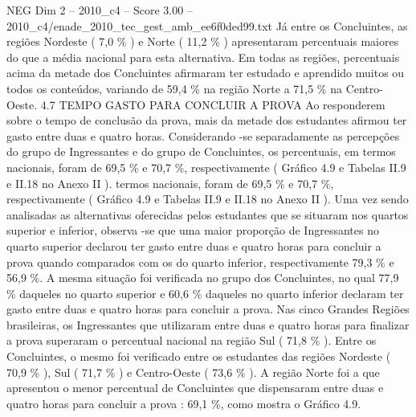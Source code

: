 \begin{textsample}{NEG Dim 2 – 2010\_c4 – Score 3.00 – 2010\_c4/enade\_2010\_tec\_gest\_amb\_ee6f0ded99.txt}
Já entre os Concluintes, as regiões Nordeste ( 7,0 \% ) e Norte ( 11,2 \% ) apresentaram percentuais maiores do que a média nacional para esta alternativa.
Em todas as regiões, percentuais acima da metade dos Concluintes afirmaram ter estudado e aprendido muitos ou todos os conteúdos, variando de 59,4 \% na região Norte a 71,5 \% na Centro-Oeste. 4.7 TEMPO GASTO PARA CONCLUIR A PROVA Ao responderem sobre o tempo de conclusão da prova, mais da metade dos estudantes afirmou ter gasto entre duas e quatro horas.
Considerando -se separadamente as percepções do grupo de Ingressantes e do grupo de Concluintes, os percentuais, em termos nacionais, foram de 69,5 \% e 70,7 \%, respectivamente ( Gráfico 4.9 e Tabelas II.9 e II.18 no Anexo II ). termos nacionais, foram de 69,5 \% e 70,7 \%, respectivamente ( Gráfico 4.9 e Tabelas II.9 e II.18 no Anexo II ).
Uma vez sendo analisadas as alternativas oferecidas pelos estudantes que se situaram nos quartos superior e inferior, observa -se que uma maior proporção de Ingressantes no quarto superior declarou ter gasto entre duas e quatro horas para concluir a prova quando comparados com os do quarto inferior, respectivamente 79,3 \% e 56,9 \%.
A mesma situação foi verificada no grupo dos Concluintes, no qual 77,9 \% daqueles no quarto superior e 60,6 \% daqueles no quarto inferior declaram ter gasto entre duas e quatro horas para concluir a prova.
Nas cinco Grandes Regiões brasileiras, os Ingressantes que utilizaram entre duas e quatro horas para finalizar a prova superaram o percentual nacional na região Sul ( 71,8 \% ).
Entre os Concluintes, o mesmo foi verificado entre os estudantes das regiões Nordeste ( 70,9 \% ), Sul ( 71,7 \% ) e Centro-Oeste ( 73,6 \% ).
A região Norte foi a que apresentou o menor percentual de Concluintes que dispensaram entre duas e quatro horas para concluir a prova : 69,1 \%, como mostra o Gráfico 4.9.

\end{textsample}
